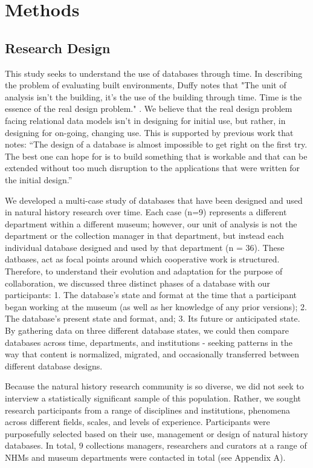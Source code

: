 \section{Methods}

\subsection{Research Design}

This study seeks to understand the use of databases through time. In describing the problem of evaluating built environments, Duffy notes that "The unit of analysis isn't the building, it's the use of the building through time. Time is the essence of the real design problem." \cite{duffy1990measuring}. We believe that the real design problem facing relational data models isn't in designing for initial use, but rather, in designing for on-going, changing use. This is supported by previous work that notes: “The design of a database is almost impossible to get right on the first try. The best one can hope for is to build something that is workable and that can be extended without too much disruption to the applications that were written for the initial design.” \cite{buneman2008curated}

We developed a multi-case study of databases that have been designed and used in natural history research over time. Each case (n=9) represents a different department within a different museum; however, our unit of analysis is not the department or the collection manager in that department, but instead each individual database designed and used by that department (n = 36). These datbases, act as focal points around which cooperative work is structured. Therefore, to understand their evolution and adaptation for the purpose of collaboration, we discussed three distinct phases of a database with our participants: 1. The database's state and format at the time that a participant began working at the museum (as well as her knowledge of any prior versions); 2. The database's present state and format, and; 3. Its future or anticipated state. By gathering data on three different database states, we could then compare databases across time, departments, and institutions - seeking patterns in the way that content is normalized, migrated, and occasionally transferred between different database designs. 

Because the natural history research community is so diverse, we did not seek to interview a statistically significant sample of this population. Rather, we sought research participants from a range of disciplines and institutions, phenomena across different fields, scales, and levels of experience. Participants were purposefully selected based on their use, management or design of natural history databases. In total, 9 collections managers, researchers and curators at a range of NHMs and museum departments were contacted in total (see Appendix A).

